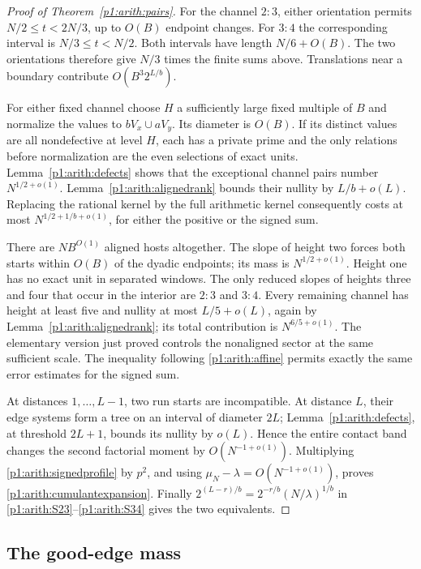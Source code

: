 \begin{proof}[Proof of Theorem~\ref{p1:arith:pairs}]
For the channel $2:3$, either orientation permits
$N/2\leq t<2N/3$, up to $O(B)$ endpoint changes.  For $3:4$ the corresponding
interval is $N/3\leq t<N/2$.  Both intervals have length $N/6+O(B)$.
The two orientations therefore give $N/3$ times the finite sums above.
Translations near a boundary contribute $O(B^3 2^{L/b})$.

For either fixed channel choose $H$ a sufficiently large fixed multiple of
$B$ and normalize the values to $bV_x\cup aV_y$.  Its diameter is $O(B)$.
If its distinct values are all nondefective at level $H$, each has a private
prime and the only relations before normalization are the even selections
of exact units.  Lemma~\ref{p1:arith:defects} shows that the exceptional
channel pairs number $N^{1/2+o(1)}$.  Lemma~\ref{p1:arith:alignedrank} bounds
their nullity by $L/b+o(L)$.  Replacing the rational kernel by the full
arithmetic kernel consequently costs at most
$N^{1/2+1/b+o(1)}$, for either the positive or the signed sum.

There are $N B^{O(1)}$ aligned hosts altogether.  The slope of height two
forces both starts within $O(B)$ of the dyadic endpoints; its mass is
$N^{1/2+o(1)}$.  Height one has no exact unit in separated windows.
The only reduced slopes of heights three and four that occur in the interior
are $2:3$ and $3:4$.  Every remaining channel has height at least five and
nullity at most $L/5+o(L)$, again by Lemma~\ref{p1:arith:alignedrank}; its
total contribution is $N^{6/5+o(1)}$. The elementary version just
proved controls the nonaligned sector at the same sufficient scale.
The inequality following
\eqref{p1:arith:affine} permits exactly the same error estimates for the signed
sum.

At distances $1,\ldots,L-1$, two run starts are incompatible.  At distance
$L$, their edge systems form a tree on an interval of diameter $2L$;
Lemma~\ref{p1:arith:defects}, at threshold $2L+1$, bounds its nullity by
$o(L)$.  Hence the entire contact band changes the second factorial moment
by $O(N^{-1+o(1)})$.  Multiplying \eqref{p1:arith:signedprofile} by $p^2$,
and using $\mu_N-\lambda=O(N^{-1+o(1)})$, proves
\eqref{p1:arith:cumulantexpansion}.  Finally
$2^{(L-r)/b}=2^{-r/b}(N/\lambda)^{1/b}$ in
\eqref{p1:arith:S23}--\eqref{p1:arith:S34} gives the two equivalents.
\end{proof}

\subsection{The good-edge mass}
\label{p14:comp:good-edge-mass}

